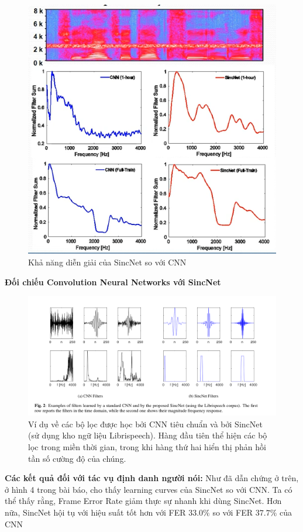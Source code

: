 \documentclass{article}
\begin{document}
\begin{itemize}
		\begin{figure}[H]
			\centering
			\includegraphics[width=.75\textwidth]{images/interpretability_2.png}
			\caption{Khả năng diễn giải của SincNet so với CNN}
			\label{fig:writing-thesis}
		\end{figure}
	\end{itemize}
	
	\textbf{Đối chiếu Convolution Neural Networks với SincNet}
	\begin{figure}[H]
		\centering
		\includegraphics[width=1\textwidth]{images/cnn_filters_sincnet_filters.png}
		\caption{Ví dụ về các bộ lọc được học bởi CNN tiêu chuẩn và bởi SincNet (sử dụng kho ngữ liệu Librispeech). Hàng đầu tiên thể hiện các bộ lọc trong miền thời gian, trong khi hàng thứ hai hiển thị phản hồi tần số cường độ của chúng.}
		\label{fig:writing-thesis}
	\end{figure}

	\textbf{Các kết quả đối với tác vụ định danh người nói: }Như đã dẫn chứng ở trên, ở hình 4 trong bài báo, cho thấy learning curves của SincNet so với CNN. Ta có thể thấy rằng, Frame Error Rate giảm thực sự nhanh khi dùng SincNet. Hơn nữa, SincNet hội tụ với hiệu suất tốt hơn với FER $33.0\%$ so với FER $37.7\%$ của CNN
	
\end{document}
